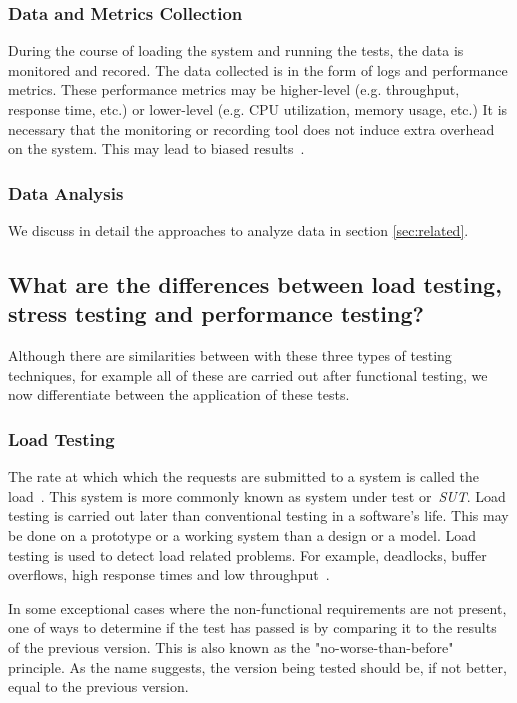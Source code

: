 \subsubsection{Data and Metrics Collection}

During the course of loading the system and running the tests, the data is monitored and recored. The data collected is in the form of logs and performance metrics. These performance metrics may be higher-level (e.g. throughput, response time, etc.) or lower-level (e.g. CPU utilization, memory usage, etc.) It is necessary that the monitoring or recording tool does not induce extra overhead on the system. This may lead to biased results~\cite{mytkowicz2010evaluating}.

\subsubsection{Data Analysis}
We discuss in detail the approaches to analyze data in section \ref{sec:related}.


\subsection{What are the differences between load testing, stress testing and performance testing?}

Although there are similarities between with these three types of testing techniques, for example all of these are carried out after functional testing, we now differentiate between the application of these tests.

\subsubsection{Load Testing}

The rate at which which the requests are submitted to a system is called the load~\cite{Beizer:1984}. This system is more commonly known as system under test or~\textit{SUT}. Load testing is carried out later than conventional testing in a software's life. This may be done on a prototype or a working system than a design or a model. Load testing is used to detect load related problems. For example, deadlocks, buffer overflows, high response times and low throughput~\cite{464549,Barna:2011,6032540}. 

In some exceptional cases where the non-functional requirements are not present, one of ways to determine if the test has passed is by comparing it to the results of the previous version. This is also known as the "no-worse-than-before" principle. As the name suggests, the version being tested should be, if not better, equal to the previous version.~\cite{Dumke:2001}

